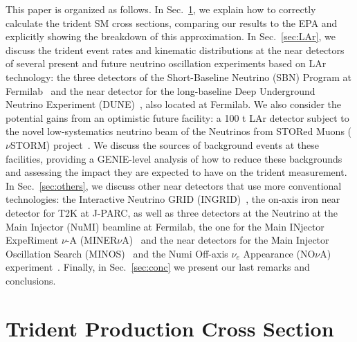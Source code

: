 This paper is organized as follows. In Sec.~\ref{sec:xsec}, we explain how to correctly calculate the trident SM cross sections, comparing our results to the EPA and explicitly showing the breakdown of this approximation. In Sec.~\ref{sec:LAr}, we discuss the trident event rates and kinematic distributions at the near detectors of several present and future neutrino oscillation experiments based on LAr technology: the three detectors of the Short-Baseline Neutrino (SBN) Program at Fermilab~\cite{SBNproposal} and the near detector for the long-baseline Deep Underground Neutrino Experiment (DUNE)~\cite{Acciarri:2016ooe,DUNECDRvolII}, also located at Fermilab. We also consider the potential gains from an optimistic future facility: a 100 t LAr detector subject to the novel low-systematics neutrino beam of the Neutrinos from STORed Muons ($\nu$STORM) project~\cite{Soler:2015ada,nuSTORM2017}. 
%
We discuss the sources of background events at these facilities, providing a GENIE-level analysis \cite{Andreopoulos2009} of how to reduce these backgrounds and assessing the impact they are expected to have on the trident measurement. 
%
In Sec.~\ref{sec:others}, we discuss other near detectors that use more conventional technologies: the Interactive Neutrino GRID (INGRID)~\cite{Abe:2011xv,Abe:2015biq,Abe:2016fic,Abe:2016tez}, the on-axis iron near detector for T2K at J-PARC, as well as three detectors at the Neutrino at the Main Injector (NuMI) beamline at Fermilab, the one for the Main INjector ExpeRiment $\nu$-A (MINER$\nu$A)~\cite{Altinok:2017xua,MINERvA:2017} and the near detectors for the Main Injector Oscillation Search (MINOS)~\cite{Adamson:2014pgc,AlpernBoehm} and the Numi Off-axis $\nu_e$ Appearance (NO$\nu$A) experiment~\cite{Wang:Biao,sanchez_mayly_2018_1286758}. 
%
Finally, in Sec.~\ref{sec:conc} we  present our last remarks and conclusions.

\section{Trident Production Cross Section}\label{sec:xsec}


